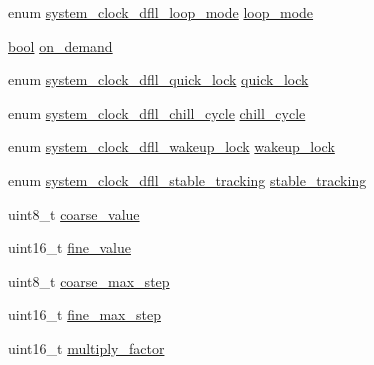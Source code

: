 \begin{DoxyCompactItemize}
\item 
enum \mbox{\hyperlink{group__asfdoc__sam0__system__clock__group_gaf264d9ce05843104cb8a393b1d9ddfa2}{system\+\_\+clock\+\_\+dfll\+\_\+loop\+\_\+mode}} \mbox{\hyperlink{structsystem__clock__source__dfll__config_a386f6ce572ff329ba13d571b9ed6e268}{loop\+\_\+mode}}
\item 
\mbox{\hyperlink{group__group__sam0__utils_ga97a80ca1602ebf2303258971a2c938e2}{bool}} \mbox{\hyperlink{structsystem__clock__source__dfll__config_a23620c12634b9230d2325ec5c245cf32}{on\+\_\+demand}}
\item 
enum \mbox{\hyperlink{group__asfdoc__sam0__system__clock__group_ga56ab87696abcd4e0103d6259386017ae}{system\+\_\+clock\+\_\+dfll\+\_\+quick\+\_\+lock}} \mbox{\hyperlink{structsystem__clock__source__dfll__config_ab1bd091a458367369f07b3ae5ac01bb7}{quick\+\_\+lock}}
\item 
enum \mbox{\hyperlink{group__asfdoc__sam0__system__clock__group_ga04ee95a872995397e3db9cf1494721e3}{system\+\_\+clock\+\_\+dfll\+\_\+chill\+\_\+cycle}} \mbox{\hyperlink{structsystem__clock__source__dfll__config_a56f3e7fb02c48f8225962450590a8b15}{chill\+\_\+cycle}}
\item 
enum \mbox{\hyperlink{group__asfdoc__sam0__system__clock__group_ga6ce68deec62f12bb85ddb2f8c103ada5}{system\+\_\+clock\+\_\+dfll\+\_\+wakeup\+\_\+lock}} \mbox{\hyperlink{structsystem__clock__source__dfll__config_a843f42c0b5b46661a11b921a5fdd43a6}{wakeup\+\_\+lock}}
\item 
enum \mbox{\hyperlink{group__asfdoc__sam0__system__clock__group_gaf9b0eb010541f1d7c8af3eeb0573043d}{system\+\_\+clock\+\_\+dfll\+\_\+stable\+\_\+tracking}} \mbox{\hyperlink{structsystem__clock__source__dfll__config_a19c44ac61bae54e6e680c62290a07c08}{stable\+\_\+tracking}}
\item 
uint8\+\_\+t \mbox{\hyperlink{structsystem__clock__source__dfll__config_a963f7fa8d903a4072243932f6bdf7435}{coarse\+\_\+value}}
\item 
uint16\+\_\+t \mbox{\hyperlink{structsystem__clock__source__dfll__config_a2ad9bda5c7114122e23b85655d283e08}{fine\+\_\+value}}
\item 
uint8\+\_\+t \mbox{\hyperlink{structsystem__clock__source__dfll__config_af9e180432db304763a2a6e85545bbd93}{coarse\+\_\+max\+\_\+step}}
\item 
uint16\+\_\+t \mbox{\hyperlink{structsystem__clock__source__dfll__config_ad003851e3f86f611abdda9f773a3de5b}{fine\+\_\+max\+\_\+step}}
\item 
uint16\+\_\+t \mbox{\hyperlink{structsystem__clock__source__dfll__config_a0a7273152483e58db6e15a14f056617c}{multiply\+\_\+factor}}
\end{DoxyCompactItemize}


